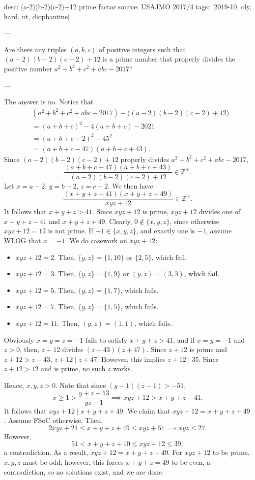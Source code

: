 desc: (a-2)(b-2)(c-2)+12 prime factor
source: USAJMO 2017/4
tags: [2019-10, oly, hard, nt, diophantine]

---

Are there any triples $(a,b,c)$ of positive integers such that $(a-2)(b-2)(c-2)+12$ is a prime number that properly divides the positive number $a^2+b^2+c^2+abc-2017$?

---

The answer is no. Notice that
\begin{align*}
    &\left(a^2+b^2+c^2+abc-2017\right)-\big((a-2)(b-2)(c-2)+12\big)\\
    &=(a+b+c)^2-4(a+b+c)-2021\\
    &=(a+b+c-2)^2-45^2\\
    &=(a+b+c-47)(a+b+c+43).
\end{align*}
Since $(a-2)(b-2)(c-2)+12$ properly divides $a^2+b^2+c^2+abc-2017$, \[\frac{(a+b+c-47)(a+b+c+43)}{(a-2)(b-2)(c-2)+12}\in\mathbb Z^+.\]
Let $x=a-2$, $y=b-2$, $z=c-2$. We then have \[\frac{(x+y+z-41)(x+y+z+49)}{xyz+12}\in\mathbb Z^+.\]
It follows that $x+y+z>41$. Since $xyz+12$ is prime, $xyz+12$ divides one of $x+y+z-41$ and $x+y+z+49$. Clearly, $0\notin\{x,y,z\}$, since otherwise $xyz+12=12$ is not prime. If $-1\in\{x,y,z\}$, and exactly one is $-1$, assume WLOG that $x=-1$. We do casework on $xyz+12$:
\begin{itemize}[itemsep=0em]
    \item $xyz+12=2$. Then, $\{y,z\}=\{1,10\}$ or $\{2,5\}$, which fail.
    \item $xyz+12=3$. Then, $\{y,z\}=\{1,9\}$ or $(y,z)=(3,3)$, which fail.
    \item $xyz+12=5$. Then, $\{y,z\}=\{1,7\}$, which fails.
    \item $xyz+12=7$. Then, $\{y,z\}=\{1,5\}$, which fails.
    \item $xyz+12=11$. Then, $(y,z)=(1,1)$, which fails.
\end{itemize}
Obviously $x=y=z=-1$ fails to satisfy $x+y+z>41$, and if $x=y=-1$ and $z>0$, then, $z+12$ divides $(z-43)(z+47)$. Since $z+12$ is prime and $z+12>z-43$, $z+12\mid z+47$. However, this implies $z+12\mid 35$. Since $z+12>12$ and is prime, no such $z$ works.

Hence, $x,y,z>0$. Note that since $(y-1)(z-1)>-51$, \[x\ge 1>\frac{y+z-53}{yz-1}\implies  xyz+12>x+y+z-41.\]
It follows that $xyz+12\mid x+y+z+49$. We claim that $xyz+12=x+y+z+49$. Assume FSoC otherwise. Then, \[2xyz+24\le x+y+z+49\le xyz+51\implies xyz\le 27.\]
However, \[51<x+y+z+10\le xyz+12\le 39,\]
a contradiction. As a result, $xyz+12=x+y+z+49$. For $xyz+12$ to be prime, $x,y,z$ must be odd; however, this forces $ x+y+z=49$ to be even, a contradiction, so no solutions exist, and we are done.
